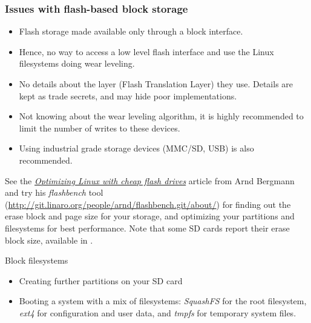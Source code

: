 \begin{frame}
  \frametitle{Issues with flash-based block storage}
  \begin{itemize}
  \item Flash storage made available only through a block interface.
  \item Hence, no way to access a low level flash interface
    and use the Linux filesystems doing wear leveling.
  \item No details about the layer (Flash Translation Layer) they
    use. Details are kept as trade secrets, and may hide poor
    implementations.
  \item Not knowing about the wear leveling algorithm, it is highly
    recommended to limit the number of writes to these devices.
  \item Using industrial grade storage devices (MMC/SD, USB) is
    also recommended.
  \end{itemize}
  See the \href{https://lwn.net/Articles/428584/}{\em Optimizing Linux with
  cheap flash drives} article from Arnd Bergmann and try his {\em
  flashbench} tool (\url{http://git.linaro.org/people/arnd/flashbench.git/about/})
  for finding out the erase block and page size for your storage, and
  optimizing your partitions and filesystems for best performance.
  Note that some SD cards report their erase block size, available in
  .
\end{frame}

\setuplabframe
{Block filesystems}
{
  \begin{itemize}
  \item Creating further partitions on your SD card
  \item Booting a system with a mix of filesystems: {\em SquashFS} for
    the root filesystem, {\em ext4} for configuration and user data, and {\em
      tmpfs} for temporary system files.
  \end{itemize}
}

